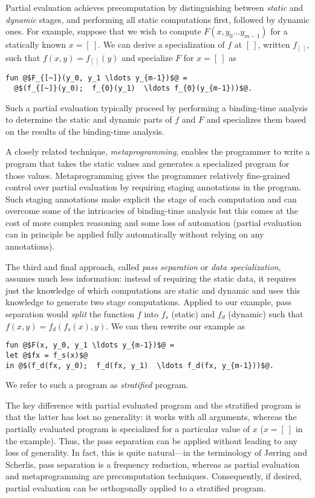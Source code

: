 Partial evaluation achieves precomputation by distinguishing between 
{\em static} and {\em dynamic} stages, and performing all static
computations first, followed by dynamic ones.  For example,
suppose that we wish to compute $F(x, y_0 \ldots y_{m-1})$ for a
statically known $x = [~]$.  We can derive a specialization of $f$ at
$[~]$, written $f_{[~]}$, such that $f(x,y) = f_{[~]}(y)$ and specialize $F$
for $x=[~]$ as
\begin{lstlisting}
fun @$F_{[~]}(y_0, y_1 \ldots y_{m-1})$@ = 
  @$(f_{[~]}(y_0);  f_{0}(y_1)  \ldots f_{0}(y_{m-1}))$@.
\end{lstlisting}
%
Such a partial evaluation typically proceed by performing a
binding-time analysis to determine the static and dynamic parts of $f$
and $F$ and specializes them based on the results of the binding-time
analysis.

A closely related technique, {\em metaprogramming}, enables the
programmer to write a program that takes the static values and
generates a specialized program for those values.  Metaprogramming
gives the programmer relatively fine-grained control over partial
evaluation by requiring staging annotations in the program.  Such
staging annotations make explicit the stage of each computation and
can overcome some of the intricacies of binding-time analysis but this
comes at the cost of more complex reasoning and some loss of
automation (partial evaluation can in principle be applied fully
automatically without relying on any annotations).

The third and final approach, called {\em pass separation} or {\em
  data specialization}, assumes much less information: instead of
requiring the static data, it requires just the knowledge of which
computations are static and dynamic and uses this knowledge to
generate two stage computations. 
%
Applied to our example, pass separation would {\em split} the function
$f$ into $f_s$ (static) and $f_d$ (dynamic) such that $f(x,y) =
f_d(f_s(x),y)$.  We can then rewrite our example as
%
\begin{lstlisting}
fun @$F(x, y_0, y_1 \ldots y_{m-1})$@ = 
let @$fx = f_s(x)$@
in @$(f_d(fx, y_0);  f_d(fx, y_1)  \ldots f_d(fx, y_{m-1}))$@.
\end{lstlisting}
We refer to such a program as {\em stratified} program.

The key difference with partial evaluated program and the stratified
program is that the latter has lost no generality: it works with all
arguments, whereas the partially evaluated program is specialized for
a particular value of $x$ ($x = [~]$ in the example).  Thus, the pass
separation can be applied without leading to any loss of generality.
In fact, this is quite natural---in the terminology of
J{\o}rring and Scherlis, pass separation is a frequency reduction,
whereas as partial evaluation and metaprogramming are precomputation
techniques. Consequently, if desired, partial evaluation can be
orthogonally applied to a stratified program.



